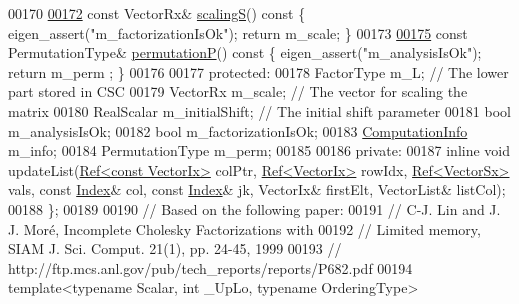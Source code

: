 \begin{DoxyCode}
00170 
\hyperlink{class_eigen_1_1_incomplete_cholesky_a30d66dd77147a84ec3302e7d5fe5d924}{00172}     \textcolor{keyword}{const} VectorRx& \hyperlink{class_eigen_1_1_incomplete_cholesky_a30d66dd77147a84ec3302e7d5fe5d924}{scalingS}()\textcolor{keyword}{ const }\{ eigen\_assert(\textcolor{stringliteral}{"m\_factorizationIsOk"}); \textcolor{keywordflow}{return} m\_scale; \}
00173 
\hyperlink{class_eigen_1_1_incomplete_cholesky_a0d52cec5e17f485a362766363ba90b02}{00175}     \textcolor{keyword}{const} PermutationType& \hyperlink{class_eigen_1_1_incomplete_cholesky_a0d52cec5e17f485a362766363ba90b02}{permutationP}()\textcolor{keyword}{ const }\{ eigen\_assert(\textcolor{stringliteral}{"m\_analysisIsOk"}); \textcolor{keywordflow}{return} m\_perm
      ; \}
00176 
00177   \textcolor{keyword}{protected}:
00178     FactorType m\_L;              \textcolor{comment}{// The lower part stored in CSC}
00179     VectorRx m\_scale;            \textcolor{comment}{// The vector for scaling the matrix }
00180     RealScalar m\_initialShift;   \textcolor{comment}{// The initial shift parameter}
00181     \textcolor{keywordtype}{bool} m\_analysisIsOk; 
00182     \textcolor{keywordtype}{bool} m\_factorizationIsOk; 
00183     \hyperlink{group__enums_ga85fad7b87587764e5cf6b513a9e0ee5e}{ComputationInfo} m\_info;
00184     PermutationType m\_perm; 
00185 
00186   \textcolor{keyword}{private}:
00187     \textcolor{keyword}{inline} \textcolor{keywordtype}{void} updateList(\hyperlink{group___core___module_class_eigen_1_1_ref}{Ref<const VectorIx>} colPtr, 
      \hyperlink{group___core___module_class_eigen_1_1_ref}{Ref<VectorIx>} rowIdx, \hyperlink{group___core___module_class_eigen_1_1_ref}{Ref<VectorSx>} vals, \textcolor{keyword}{const} \hyperlink{namespace_eigen_a62e77e0933482dafde8fe197d9a2cfde}{Index}& col, \textcolor{keyword}{const} 
      \hyperlink{namespace_eigen_a62e77e0933482dafde8fe197d9a2cfde}{Index}& jk, VectorIx& firstElt, VectorList& listCol); 
00188 \}; 
00189 
00190 \textcolor{comment}{// Based on the following paper:}
00191 \textcolor{comment}{//   C-J. Lin and J. J. Moré, Incomplete Cholesky Factorizations with}
00192 \textcolor{comment}{//   Limited memory, SIAM J. Sci. Comput.  21(1), pp. 24-45, 1999}
00193 \textcolor{comment}{//   http://ftp.mcs.anl.gov/pub/tech\_reports/reports/P682.pdf}
00194 \textcolor{keyword}{template}<\textcolor{keyword}{typename} Scalar, \textcolor{keywordtype}{int} \_UpLo, \textcolor{keyword}{typename} OrderingType>

\end{DoxyCode}
